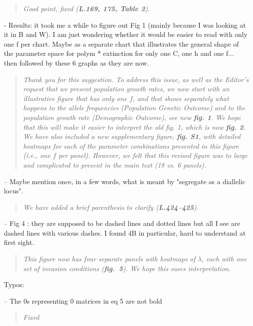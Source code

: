 \documentclass[11pt]{article}
\begin{document}
\begin{quote}
	{\itshape Good point, fixed ({\bf L.169, 175, Table 2}).}
\end{quote}

- Results: it took me a while to figure out Fig 1 (mainly because I was looking at it in B and W). I am just wondering whether it would be easier to read with only one f per chart. Maybe as a separate chart that illustrates the general shape of the parameter space for polym * extinction for only one C, one h and one f... then followed by these 6 graphs as they are now.

\begin{quote}
	{\itshape Thank you for this suggestion. To address this issue, as well as the Editor's request that we present population growth rates, we now start with an illustrative figure that has only one $f$, and that shows separately what happens to the allele frequencies (Population Genetic Outcome) and to the population growth rate (Demographic Outcome), see new {\bf fig. 1}. We hope that this will make it easier to interpret the old fig. 1, which is now {\bf fig. 2}. We have also included a new supplementary figure, {\bf fig. S1}, with detailed heatmaps for each of the parameter combinations presented in this figure (i.e., one $f$ per panel). However, we felt that this revised figure was to large and complicated to present in the main text (18 vs. 6 panels).}
\end{quote}

\noindent-- Maybe mention once, in a few words, what is meant by "segregate as a diallelic locus".
\begin{quote}
	{\itshape We have added a brief parenthesis to clarify ({\bf L.424--425}).}
\end{quote}

\noindent-- Fig 4 : they are supposed to be dashed lines and dotted lines but all I see are dashed lines with various dashes. I found 4B in particular, hard to understand at first sight.

\begin{quote}
	{\itshape This figure now has four separate panels with heatmaps of $\lambda$, each with one set of invasion conditions ({\bf fig.~5}). We hope this eases interpretation.}
\end{quote}
\bigskip

\noindent Typos:
\smallskip

\noindent-- The 0s representing 0 matrices in eq 5 are not bold
\begin{quote}
	{\itshape Fixed}
\end{quote}
\end{document}
